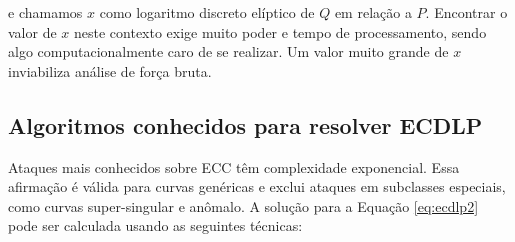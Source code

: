 e chamamos \(x\) como logaritmo discreto elíptico de \(Q\) em relação a \(P\). \cite{Hoffstein:2008} Encontrar o valor de \(x\) neste contexto exige muito poder e tempo de processamento, sendo algo computacionalmente caro de se realizar. Um valor muito grande de \(x\) inviabiliza análise de força bruta.

%
%
\subsection{Algoritmos conhecidos para resolver ECDLP}
\label{sec:algs}
Ataques mais conhecidos sobre ECC têm complexidade exponencial. Essa afirmação é válida para curvas genéricas e exclui ataques em subclasses especiais, como curvas super-singular e anômalo. A solução para a Equação \ref{eq:ecdlp2} pode ser calculada usando as seguintes técnicas: \cite{Pelzl:2006}


